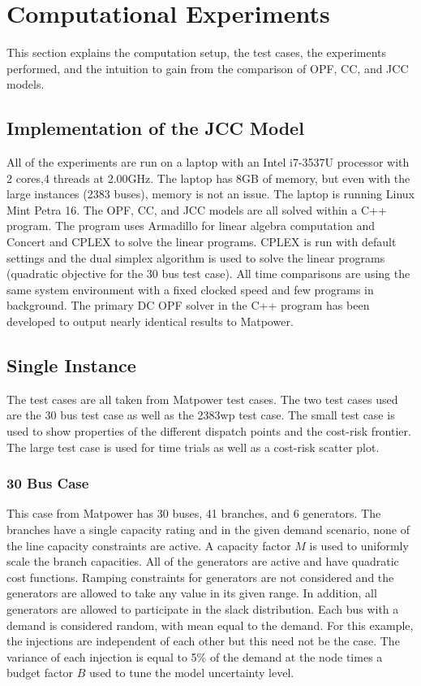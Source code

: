 \section{Computational Experiments}\label{computationalresults}
This section explains the computation setup, the test cases, the experiments performed, and the intuition to gain from the comparison of OPF, CC, and JCC models.
\subsection{Implementation of the JCC Model}
All of the experiments are run on a laptop with an Intel i7-3537U processor with 2 cores,4 threads at 2.00GHz.  The laptop has 8GB of memory, but even with the large instances (2383 buses), memory is not an issue.  The laptop is running Linux Mint Petra 16.  The OPF, CC, and JCC models are all solved within a C++ program.  The program uses Armadillo\cite{armadillo} for linear algebra computation and Concert and CPLEX to solve the linear programs.  CPLEX is run with default settings and the dual simplex algorithm is used to solve the linear programs (quadratic objective for the 30 bus test case).  All time comparisons are using the same system environment with a fixed clocked speed and few programs in background.  The primary DC OPF solver in the C++ program has been developed to output nearly identical results to Matpower\cite{matpower}.
\subsection{Single Instance}
The test cases are all taken from Matpower test cases.  The two test cases used are the 30 bus test case as well as the 2383wp test case.  The small test case is used to show properties of the different dispatch points and the cost-risk frontier.  The large test case is used for time trials as well as a cost-risk scatter plot.  

\subsubsection*{30 Bus Case}
This case from Matpower has 30 buses, 41 branches, and 6 generators.  The branches have a single capacity rating and in the given demand scenario, none of the line capacity  constraints are active.  A capacity factor $M$ is used to uniformly scale the branch capacities.  All of the generators are active and have quadratic cost functions.  Ramping constraints for generators are not considered and the generators are allowed to take any value in its given range.  In addition, all generators are allowed to participate in the slack distribution.  Each bus with a demand is considered random, with mean equal to the demand.  For this example, the injections are independent of each other but this need not be the case.  The variance of each injection is equal to 5\% of the demand at the node times a budget factor $B$ used to tune the model uncertainty level.

